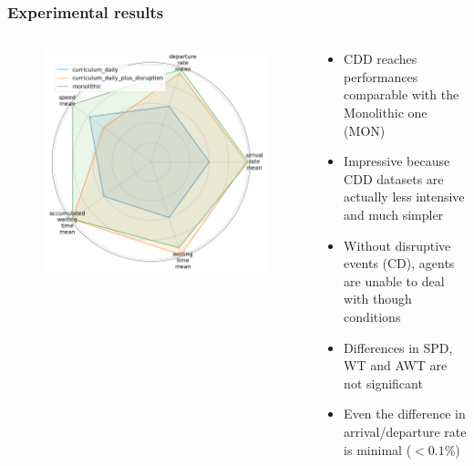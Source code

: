 \documentclass[dvipsnames]{beamer}
\begin{document}
\begin{frame}
\frametitle{Experimental results}
  \begin{columns}
  \begin{column}{0.5\textwidth}
    \begin{figure}
      \centering
      \includegraphics[width=1.0\textwidth]{figures/dataset-radar.png}
    \end{figure}
  \end{column}
  \begin{column}{0.5\textwidth}
    \begin{itemize}
      \item CDD reaches performances comparable with the Monolithic one (MON)
      \item Impressive because CDD datasets are actually less intensive and much simpler
      \item Without disruptive events (CD), agents are unable to deal with though conditions
      \item Differences in SPD, WT and AWT are not significant
      \item Even the difference in arrival/departure rate is minimal ($< 0.1\%$)
    \end{itemize}
  \end{column}
\end{columns}
\end{frame}
\end{document}
